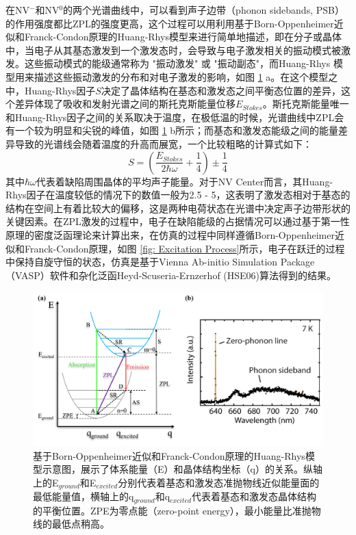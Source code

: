 \documentclass[type = bachelor]{whu-thesis}
\begin{document}
在NV$^-$和NV$^0$的两个光谱曲线中，可以看到声子边带（phonon sidebands, PSB）的作用强度都比ZPL的强度更高，这个过程可以用利用基于Born-Oppenheimer近似和Franck-Condon原理的Huang-Rhys模型来进行简单地描述，即在分子或晶体中，当电子从其基态激发到一个激发态时，会导致与电子激发相关的振动模式被激发。这些振动模式的能级通常称为 "振动激发" 或 "振动副态"，而Huang-Rhys 模型用来描述这些振动激发的分布和对电子激发的影响，如图 \ref{fig: Franck-Condon} a\cite{Zou2024}。在这个模型之中，Huang-Rhys因子$S$决定了晶体结构在基态和激发态之间平衡态位置的差异，这个差异体现了吸收和发射光谱之间的斯托克斯能量位移$E_{Stokes}$。斯托克斯能量唯一和Huang-Rhys因子之间的关系取决于温度，在极低温的时候，光谱曲线中ZPL会有一个较为明显和尖锐的峰值，如图 \ref{fig: Franck-Condon} b所示；而基态和激发态能级之间的能量差异导致的光谱线会随着温度的升高而展宽，一个比较粗略的计算式如下： 
\begin{equation}
  S = (\frac{E_{Stokes}}{2\hbar \omega}+\frac{1}{4})±\frac{1}{4}
\end{equation}
其中$\hbar \omega$代表着缺陷周围晶体的平均声子能量\cite{de2015resolving}。对于NV Center而言，其Huang-Rhys因子在温度较低的情况下的数值一般为2.5 - 5，这表明了激发态相对于基态的结构在空间上有着比较大的偏移，这是两种电荷状态在光谱中决定声子边带形状的关键因素。在ZPL激发的过程中，电子在缺陷能级的占据情况可以通过基于第一性原理的密度泛函理论来计算出来，在仿真的过程中同样遵循Born-Oppenheimer近似和Franck-Condon原理，如图 \ref{fig: Excitation Process}所示，电子在跃迁的过程中保持自旋守恒的状态，仿真是基于Vienna Ab-initio Simulation Package（VASP）软件和杂化泛函Heyd-Scuseria-Ernzerhof (HSE06)算法得到的结果\cite{Zou2024}。


\begin{figure}
  \centering
  \includegraphics[width=1.0\textwidth]{figures/Chapter 3/Franck-Condon.png}
  \caption[基于Born-Oppenheimer近似和Franck-Condon原理的Huang-Rhys模型示意图]{基于Born-Oppenheimer近似和Franck-Condon原理的Huang-Rhys模型示意图，展示了体系能量（E）和晶体结构坐标（q）的关系。纵轴上的E$_{ground}$和E$_{excited}$分别代表着基态和激发态准抛物线近似能量面的最低能量值，横轴上的q$_{ground}$和q$_{excited}$代表着基态和激发态晶体结构的平衡位置。ZPE为零点能（zero-point energy），最小能量比准抛物线的最低点稍高。}
  \label{fig: Franck-Condon}
\end{figure}
\end{document}
